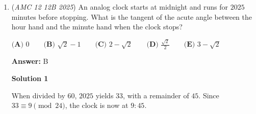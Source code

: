 \begin{enumerate}
 
 \[V_2-V_1=\frac{7x}{3}\] and 
 \[V_3-V_2=\frac{19x}{3}\] 

 Then the time $t$ for the top to fill up is given by 
 \[\frac{\frac{19x}{3}}{\frac{7x}{3}}=\frac{t}{35}\] Therefore  $t=\boxed{\mathbf{(D)}\ 95}$

 -AARONPICK2

 



\textbf{Solution 5(Similar to Solution 1)}

Extend the trapezoidal shape into a square pyramid. Note that we're only extending the height by another factor of the height. In other words, if the height from the $1 \times 1$ base to the midline is $h$, the height from the $2 \times 2$ base(which is the midline) to the $3 \times 3$ base(which is the finish) is also $h$. Now using this logic, the distance from the $1 \times 1$ base to the top of the pyramid is obviously also $h$. Now the problem is easy. Computing the volume of the first half of the trapezoidal shape(which takes $35$ minutes for the hose to fill) is 

 $\frac{1}{3} (2 \cdot 2) \cdot (2h) - \frac{1}{3} (1 \cdot 1) \cdot (h) = \frac{7h}{3}$ which takes $35$ minutes. So to fill up to the height $h$ we get

 $h$ takes $35 \cdot \frac{3}{7} = 15$ minutes to fill. 

 Now to find the volume of the last half of he trapezoidal shape we get

 $\frac{1}{3} (3 \cdot 3) \cdot (3h) - \frac{1}{3} (2 \cdot 2) \cdot (2h) = \frac{19h}{3}$ so if we plug in $h$ takes $15$ minutes to fill we get

 $\frac{19h}{3}$ takes $\frac{19 \cdot 15}{3} = 19 \cdot 5 = \boxed{95}$ minutes to fill.

 


	\item (\textit{AMC 12 12B 2025}) An analog clock starts at midnight and runs for $2025$ minutes before stopping. What is the tangent of the acute angle between the hour hand and the minute hand when the clock stops?


 $\textbf{(A) } 0 \qquad \textbf{(B) } \sqrt{2}-1 \qquad \textbf{(C) } 2-\sqrt{2} \qquad \textbf{(D) } \frac{\sqrt{2}}{2} \qquad \textbf{(E) } 3-\sqrt{2}$

 \textbf{Answer: }B



\textbf{Solution 1}

When divided by $60$, $2025$ yields $33$, with a remainder of $45$. Since $33 \equiv 9 \pmod{24}$, the clock is now at $9:45$. 


\end{enumerate}

